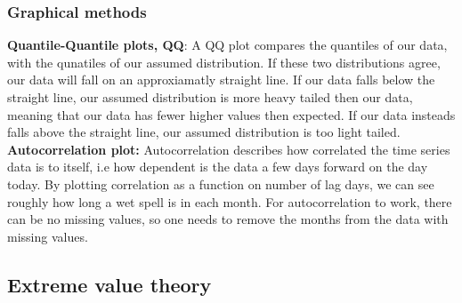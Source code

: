 \documentclass{article}
\begin{document}
	\subsubsection{Graphical methods}
	\textbf{Quantile-Quantile plots, QQ}: A QQ  plot compares the quantiles of our data, with the qunatiles of our assumed distribution. If these two distributions agree, our data will fall on an approxiamatly straight line. If our data falls below the straight line, our assumed distribution is more heavy tailed then our data, meaning that our data has fewer higher values then expected. If our data insteads falls above the straight line, our assumed distribution is too light tailed. \\
	\textbf{Autocorrelation plot:} Autocorrelation describes how correlated the time series data is to itself, i.e how dependent is the data a few days forward on the day today. By plotting correlation as a function on number of lag days, we can see roughly how long a wet spell is in each month. For autocorrelation to work, there can be no missing values, so one needs to remove the months from the data with missing values. 
	\subsection{Extreme value theory}
\end{document}
